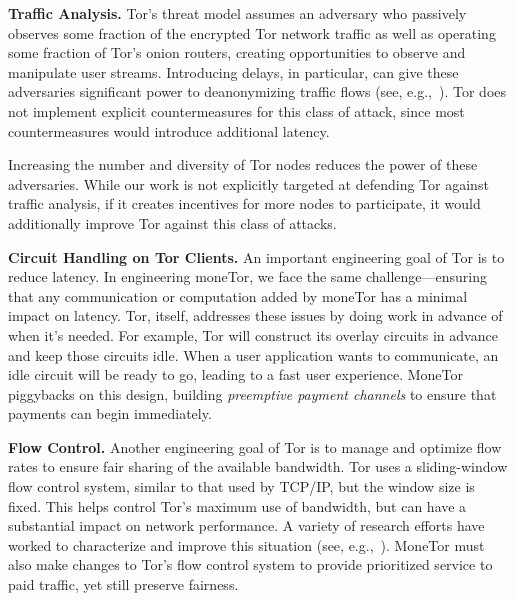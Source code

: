 \textbf{Traffic Analysis.}
Tor's threat model assumes an adversary who passively observes some fraction of the encrypted Tor network traffic as well as operating some fraction of Tor's onion routers, creating opportunities to observe and manipulate user streams.
Introducing delays, in particular, can give these adversaries significant power to deanonymizing traffic flows (see, e.g.,~\cite{fu2009one,rochet2018dropping}).
Tor does not implement explicit countermeasures for this class of attack, since most countermeasures would introduce additional latency.

Increasing the number and diversity of Tor nodes reduces the power of these adversaries.
While our work is not explicitly targeted at defending Tor against traffic analysis, if it creates incentives for more nodes to participate, it would additionally improve Tor against this class of attacks.

\medskip \noindent \textbf{Circuit Handling on Tor Clients.}
An important engineering goal of Tor is to reduce latency.
In engineering moneTor, we face the same challenge---ensuring that any communication or computation added by moneTor has a minimal impact on latency.
Tor, itself, addresses these issues by doing work in advance of when it's needed.
For example, Tor will construct its overlay circuits in advance and keep those circuits idle.
When a user application wants to communicate, an idle circuit will be ready to go, leading to a fast user experience.
MoneTor piggybacks on this design, building {\em preemptive payment channels} to ensure that payments can begin immediately.

\medskip \noindent\textbf{Flow Control.}
Another engineering goal of Tor is to manage and optimize flow rates to ensure fair sharing of the available bandwidth.
Tor uses a sliding-window flow control system, similar to that used by TCP/IP, but the window size is fixed.
This helps control Tor's maximum use of bandwidth, but can have a substantial impact on network performance.
A variety of research efforts have worked to characterize and improve this situation (see, e.g.,~\cite{pets2011-defenestrator,mind-the-gap-2016}).
MoneTor must also make changes to Tor's flow control system to provide prioritized service to paid traffic, yet still preserve fairness.

